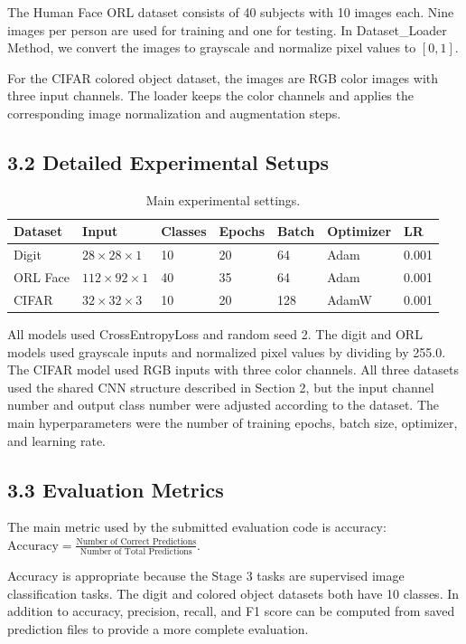 \documentclass[10pt]{article}
\begin{document}
The Human Face ORL dataset consists of 40 subjects with 10 images each. Nine images per person are used for training and one for testing. In Dataset\_Loader Method, we convert the images to grayscale and normalize pixel values to $[0, 1]$.

For the CIFAR colored object dataset, the images are RGB color images with three input channels. The loader keeps the color channels and applies the corresponding image normalization and augmentation steps.
\subsection*{3.2 Detailed Experimental Setups}

\begin{table}[H]
\centering
\small
\renewcommand{\arraystretch}{1.05}
\begin{tabular}{l l l l l l l}
\toprule
Dataset & Input & Classes & Epochs & Batch & Optimizer & LR \\
\midrule
Digit & $28\times28\times1$ & 10 & 20 & 64 & Adam & 0.001 \\
ORL Face & $112\times92\times1$ & 40 & 35 & 64 & Adam & 0.001 \\
CIFAR & $32\times32\times3$ & 10 & 20 & 128 & AdamW & 0.001 \\
\bottomrule
\end{tabular}
\caption{Main experimental settings.}
\end{table}

All models used CrossEntropyLoss and random seed 2. The digit and ORL models used grayscale inputs and normalized pixel values by dividing by 255.0. The CIFAR model used RGB inputs with three color channels. All three datasets used the shared CNN structure described in Section 2, but the input channel number and output class number were adjusted according to the dataset. The main hyperparameters were the number of training epochs, batch size, optimizer, and learning rate.

\subsection*{3.3 Evaluation Metrics}

The main metric used by the submitted evaluation code is accuracy:
\(\text{Accuracy} = \frac{\text{Number of Correct Predictions}}{\text{Number of Total Predictions}}\).

Accuracy is appropriate because the Stage 3 tasks are supervised image classification tasks. The digit and colored object datasets both have 10 classes. In addition to accuracy, precision, recall, and F1 score can be computed from saved prediction files to provide a more complete evaluation.
\end{document}
